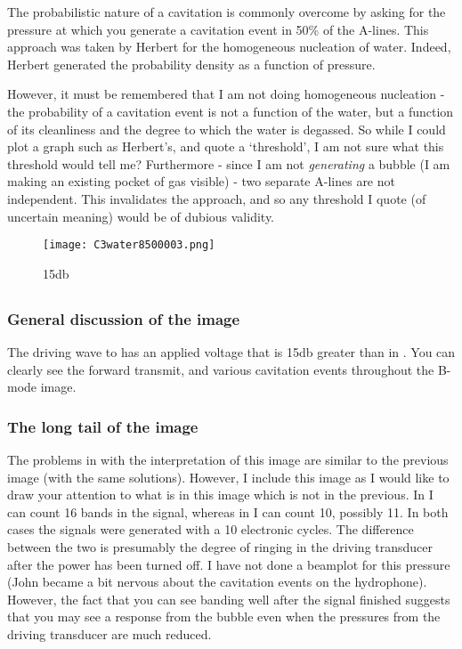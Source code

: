 The probabilistic nature of a cavitation is commonly overcome by asking for the pressure at which you 
generate a cavitation event in  50\% of the A-lines.
This approach was taken by Herbert\cite{Herbert2006} for the homogeneous nucleation of water.
Indeed, Herbert generated the probability density as a function of pressure.

However, it must be remembered that I am not doing homogeneous nucleation - 
the probability of a cavitation event is not a function of the water, 
but a function of its cleanliness and the degree to which the water is degassed.
So while I could plot a graph such as Herbert's, and quote a `threshold', I am not sure what this threshold would tell me?
Furthermore - since I am not {\em generating} a bubble (I am making an existing pocket of gas visible) - 
two separate A-lines are not independent. 
This invalidates the approach, and so any threshold I quote (of uncertain meaning) would be of dubious validity.



\begin{figure}[h]
     \centering
          \texttt{[image: C3water8500003.png]}
     \caption{15db}
   \label{fig:water_cavitation_85}
\end{figure}


\subsection{}
\subsubsection{General discussion of the image}
The driving wave to  has an applied voltage that is 15db greater than in .
You can clearly see the forward transmit, and various cavitation events throughout the B-mode image.

\subsubsection{The long tail of the image}
The problems in with the interpretation of this image are similar to the previous image (with the same solutions).
However, I include this image as I would like to draw your attention to what is in this image which is not in the previous.
In  I can count 16 bands in the signal, whereas in  I can count 10, possibly 11.
In both cases the signals were generated with a 10 electronic cycles. 
The difference between the two is presumably the degree of ringing in the driving transducer after the power has been turned off.
I have not done a beamplot for this pressure (John became a bit nervous about the cavitation events on the hydrophone).
However, the fact that you can see banding well after the signal finished suggests 
that you may see a response from the bubble even when the pressures from the driving transducer
are much reduced.

